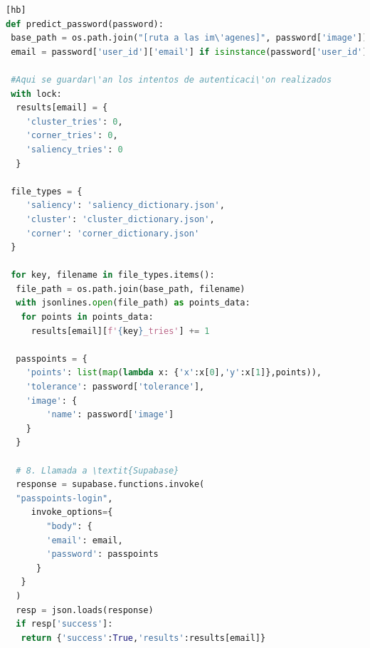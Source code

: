 \begin{lstlisting}[style=mystyle, language=Python, caption=C\'odigo que se ejecuta en cada hilo del ataque, label=attack][hb]
def predict_password(password):
 base_path = os.path.join("[ruta a las im\'agenes]", password['image'])  # Directorio base organizado
 email = password['user_id']['email'] if isinstance(password['user_id'], dict) else None

 #Aqui se guardar\'an los intentos de autenticaci\'on realizados
 with lock:
  results[email] = {
	'cluster_tries': 0,
	'corner_tries': 0,
	'saliency_tries': 0
  }

 file_types = {
	'saliency': 'saliency_dictionary.json',
	'cluster': 'cluster_dictionary.json',
	'corner': 'corner_dictionary.json'	
 }

 for key, filename in file_types.items():
  file_path = os.path.join(base_path, filename)
  with jsonlines.open(file_path) as points_data:
   for points in points_data:
     results[email][f'{key}_tries'] += 1

  passpoints = {
	'points': list(map(lambda x: {'x':x[0],'y':x[1]},points)),
	'tolerance': password['tolerance'],
	'image': {
		'name': password['image']
	}
  }

  # 8. Llamada a \textit{Supabase}  
  response = supabase.functions.invoke(
  "passpoints-login",
     invoke_options={
    	"body": {
		'email': email,
		'password': passpoints
 	  }
   }
  )
  resp = json.loads(response)
  if resp['success']:
   return {'success':True,'results':results[email]}
\end{lstlisting}
